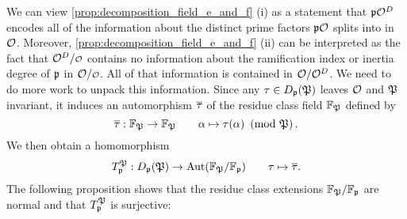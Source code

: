     We can view \cref{prop:decomposition_field_e_and_f} (i) as a statement that $\mathfrak{p}\mathcal{O}^{D}$ encodes all of the information about the distinct prime factors $\mathfrak{p}\mathcal{O}$ splits into in $\mathcal{O}$. Moreover, \cref{prop:decomposition_field_e_and_f} (ii) can be interpreted as the fact that $\mc{O}^{D}/\smc{O}$ contains no information about the ramification index or inertia degree of $\mathfrak{p}$ in $\mc{O}/\smc{O}$. All of that information is contained in $\mathcal{O}/\mathcal{O}^{D}$. We need to do more work to unpack this information. Since any $\tau \in D_{\mathfrak{p}}(\mathfrak{P})$ leaves $\mathcal{O}$ and $\mathfrak{P}$ invariant, it induces an automorphism $\overline{\tau}$ of the residue class field $\mathbb{F}_{\mathfrak{P}}$ defined by
    \[
      \overline{\tau}:\mathbb{F}_{\mathfrak{P}}\to \mathbb{F}_{\mathfrak{P}}\qquad \alpha \mapsto \tau(\alpha) \ \left(\text{mod }\mathfrak{P}\right).
    \]
    We then obtain a homomorphism
    \[
      T_{\mathfrak{p}}^{\mathfrak{P}}:D_{\mathfrak{p}}(\mathfrak{P}) \to \operatorname{\mathrm{Aut}}(\mathbb{F}_{\mathfrak{P}}/\mathbb{F}_{\mathfrak{p}}) \qquad \tau \mapsto \overline{\tau}.
    \]
    The following proposition shows that the residue class extensions $\mathbb{F}_{\mathfrak{P}}/\mathbb{F}_{\mathfrak{p}}$ are normal and that $T_{\mathfrak{p}}^{\mathfrak{P}}$ is surjective:
    
